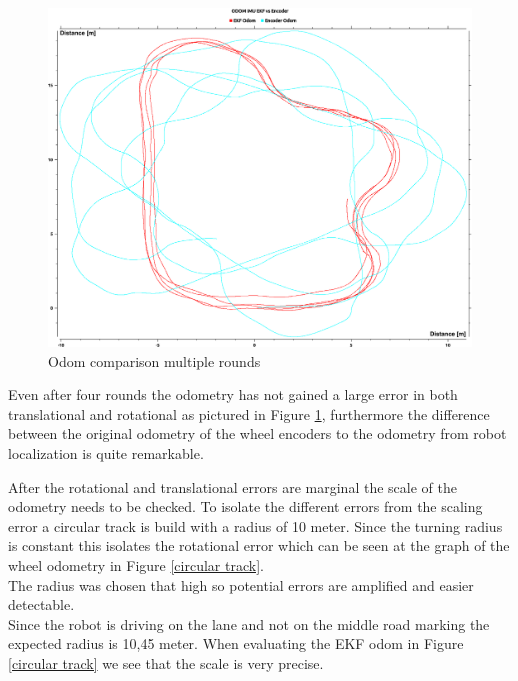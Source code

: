 \begin{figure} 
	\includegraphics[width=\textwidth]{Pictures/odom comp multiple rounds}
	\caption{Odom comparison multiple rounds}
	\label{Odom comparison multiple rounds}

\end{figure}

Even after four rounds the odometry has not gained a large error in both translational and rotational as pictured in Figure \ref{Odom comparison multiple rounds}, furthermore the difference between the original odometry of the wheel encoders to the odometry from robot localization is quite remarkable.

After the rotational and translational errors are marginal the scale of the odometry needs to be checked.
To isolate the different errors from the scaling error a circular track is build with a radius of 10 meter. Since the turning radius is constant this isolates the rotational error which can be seen at the graph of the wheel odometry in Figure \ref{circular track}.\\
The radius was chosen that high so potential errors are amplified and easier detectable.\\
Since the robot is driving on the lane and not on the middle road marking the expected radius is 10,45 meter. When evaluating the EKF odom in Figure \ref{circular track} we see that the scale is very precise.
 
